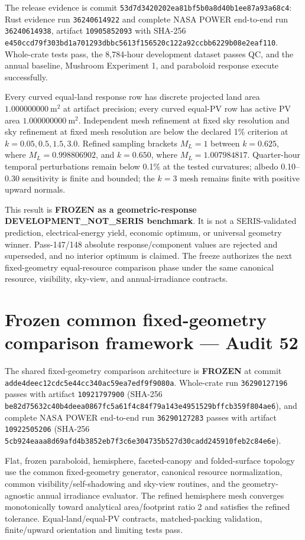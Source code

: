 \documentclass[11pt,a4paper]{article}
\begin{document}
The release evidence is commit \texttt{53d7d3420202ea81bf5b0a8d40b1ee87a93a68c4}: Rust evidence run \texttt{36240614922} and complete NASA POWER end-to-end run \texttt{36240614938}, artifact \texttt{10905852093} with SHA-256 \texttt{e450ccd79f303bd1a701293dbbc5613f156520c122a92ccbb6229b08e2eaf110}. Whole-crate tests pass, the 8,784-hour development dataset passes QC, and the annual baseline, Mushroom Experiment 1, and paraboloid response execute successfully.

Every curved equal-land response row has discrete projected land area \(1.000000000~\mathrm{m^2}\) at artifact precision; every curved equal-PV row has active PV area \(1.000000000~\mathrm{m^2}\). Independent mesh refinement at fixed sky resolution and sky refinement at fixed mesh resolution are below the declared 1\% criterion at \(k=0.05,0.5,1.5,3.0\). Refined sampling brackets \(M_L=1\) between \(k=0.625\), where \(M_L=0.998806902\), and \(k=0.650\), where \(M_L=1.007984817\). Quarter-hour temporal perturbations remain below 0.1\% at the tested curvatures; albedo 0.10--0.30 sensitivity is finite and bounded; the \(k=3\) mesh remains finite with positive upward normals.

This result is \textbf{FROZEN as a geometric-response DEVELOPMENT\_NOT\_SERIS benchmark}. It is not a SERIS-validated prediction, electrical-energy yield, economic optimum, or universal geometry winner. Pass-147/148 absolute response/component values are rejected and superseded, and no interior optimum is claimed. The freeze authorizes the next fixed-geometry equal-resource comparison phase under the same canonical resource, visibility, sky-view, and annual-irradiance contracts.


\section{Frozen common fixed-geometry comparison framework --- Audit 52}
The shared fixed-geometry comparison architecture is \textbf{FROZEN} at commit \texttt{adde4deec12cdc5e44cc340ac59ea7edf9f9080a}. Whole-crate run \texttt{36290127196} passes with artifact \texttt{10921797900} (SHA-256 \texttt{be82d75632c40b4deea0867fc5a61f4c84f79a143e4951529bffcb359f804ae6}), and complete NASA POWER end-to-end run \texttt{36290127283} passes with artifact \texttt{10922505206} (SHA-256 \texttt{5cb924eaaa8d69afd4b3852eb7f3c6e304735b527d30cadd245910feb2c84e6e}).

Flat, frozen paraboloid, hemisphere, faceted-canopy and folded-surface topology use the common fixed-geometry generator, canonical resource normalization, common visibility/self-shadowing and sky-view routines, and the geometry-agnostic annual irradiance evaluator. The refined hemisphere mesh converges monotonically toward analytical area/footprint ratio 2 and satisfies the refined tolerance. Equal-land/equal-PV contracts, matched-packing validation, finite/upward orientation and limiting tests pass.
\end{document}
